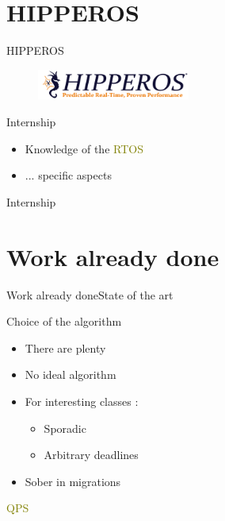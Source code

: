 \documentclass[10pt]{beamer}
\newcommand{\emphS}[1]{\textcolor{olive}{#1}}
\begin{document}
\section{HIPPEROS}
\begin{frame}{HIPPEROS}{}
\begin{figure}[h]
	\includegraphics[height=1cm]{img/HIPPEROS_logo_slogan}
\end{figure}
\begin{minipage}{0.6\textwidth}
\begin{block}{Internship}
    \begin{itemize}
      \item Knowledge of the \emphS{RTOS}
      \item ... specific aspects
    \end{itemize}
  \end{block}
\end{minipage}
\begin{minipage}{0.25\textwidth}
  \begin{block}{Internship}
  \end{block}
\end{minipage}
\end{frame}

\section{Work already done}
\begin{frame}{Work already done}{State of the art}
  \begin{minipage}{0.5\textwidth}
    \begin{block}
      {Choice of the algorithm} 
      \begin{itemize}
        \item There are plenty
        \item No ideal algorithm
        \item For interesting classes :
		\begin{itemize}
        [circle]
        	\item Sporadic
            \item Arbitrary deadlines
        \end{itemize}
        \item Sober in migrations 
		\end{itemize}
    \end{block}
  \end{minipage}
  \begin{minipage}{0.4\textwidth}
  	\LARGE\emphS{QPS}
  \end{minipage}
\end{frame}
\end{document}
